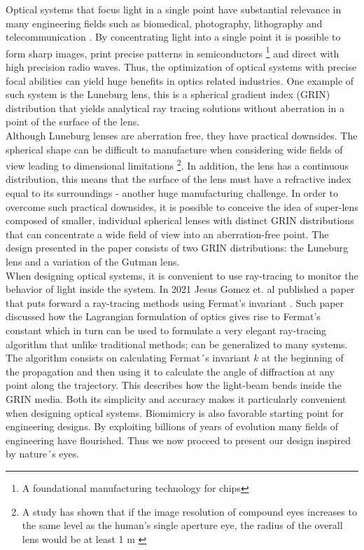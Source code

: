 \label{sec:introduction}
Optical systems that focus light in a single point have substantial relevance in many engineering fields such as biomedical, photography, lithography and telecommunication \cite{machikhin2015double,bn2022application,brunner1997impact,bjorkqvist2019additive}. By concentrating light into a single point it is possible to form sharp images, print precise patterns in semiconductors \footnote{A foundational manufacturing technology for chips} and direct with high precision radio waves. Thus, the optimization of optical systems with precise focal abilities can yield huge benefits in optics related industries. One example of such system is the Luneburg lens, this is a spherical gradient index (GRIN) distribution that yields analytical ray tracing solutions without aberration in a point of the surface of the lens. \\ 

Although Luneburg lenses are aberration free, they have practical downsides. The spherical shape can be difficult to manufacture when considering wide fields of view leading to dimensional limitations \footnote{A study has shown that if the image resolution of compound  eyes increases to the same level as the human’s single aperture eye, the radius of the overall lens would be at least 1 m \cite{kirschfeld1976resolution}}. In addition, the lens has a continuous distribution, this means that the surface of the lens must have a refractive index equal to its surroundings - another huge manufacturing challenge. In order to overcome such practical downsides, it is possible to conceive the idea of super-lens composed of smaller, individual spherical lenses with distinct GRIN distributions that can concentrate a wide field of view into an aberration-free point. The design presented in the paper consists of two GRIN distributions: the Luneburg lens and a variation of the Gutman lens.\\

When designing optical systems, it is convenient to use ray-tracing to monitor the behavior of light inside the system. In 2021 Jesus Gomez et. al published a paper that puts forward a ray-tracing methods using Fermat's invariant \cite{GomezCorrea21}. Such paper discussed how the Lagrangian formulation of optics gives rise to Fermat's constant which in turn can be used to formulate a very elegant ray-tracing algorithm that unlike traditional methods; can be generalized to many systems. The algorithm consists on calculating Fermat´s invariant $k$ at the beginning of the propagation and then using it to calculate the angle of diffraction at any point along the trajectory. This describes how the light-beam bends inside the GRIN media. Both its simplicity and accuracy makes it particularly convenient when designing optical systems. Biomimicry is also favorable starting point for engineering designs. By exploiting billions of years of evolution many fields of engineering have flourished. Thus we now proceed to present our design inspired by nature´s eyes. \\